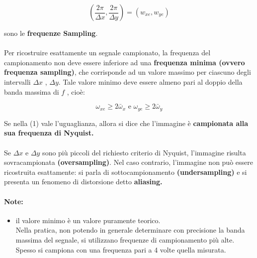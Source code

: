 $$
    (\frac{2\pi}{\Delta x}, \frac{2 \pi}{\Delta y}) = (w_{xe}, w_{ye})
$$

sono le \textbf{frequenze Sampling}. \\\\Per ricostruire esattamente un segnale
campionato, la frequenza del campionamento non deve essere inferiore ad una
\textbf{frequenza minima (ovvero frequenza sampling)}, che corrisponde ad un
valore massimo per ciascuno degli intervalli $\Delta x$ , $\Delta y$. Tale
valore minimo deve essere almeno pari al doppio della banda massima di $f$ ,
cioè:

$$
    \omega_{xe} \geq 2 \bar{\omega}_x \text{ e } \omega_{ye} \geq 2 \bar{\omega}_y
$$

Se nella (1) vale l'uguaglianza, allora si dice che l'immagine è
\textbf{campionata alla sua frequenza di Nyquist.}
\\\\Se $\Delta x$ e $\Delta y$ sono più piccoli del richiesto criterio di
Nyquist, l'immagine risulta sovracampionata \textbf{(oversampling)}. Nel caso
contrario, l'immagine non può essere ricostruita esattamente: si parla di
sottocampionamento \textbf{(undersampling)} e si presenta un fenomeno di
distorsione detto \textbf{aliasing.}

\paragraph{Note:}
\begin{itemize}
    \item il valore minimo è un valore puramente teorico. \\Nella pratica, non
          potendo in generale determinare con precisione la banda massima del
          segnale, si utilizzano frequenze di campionamento più alte. \\Spesso
          si campiona con una frequenza pari a 4 volte quella misurata.
\end{itemize}

